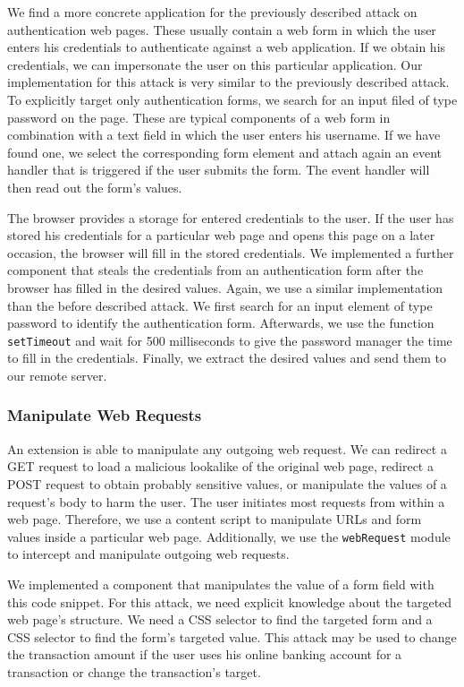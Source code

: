 	We find a more concrete application for the previously described attack on authentication web pages. These usually contain a web form in which the user enters his credentials to authenticate against a web application. If we obtain his credentials, we can impersonate the user on this particular application. Our implementation for this attack is very similar to the previously described attack. To explicitly target only authentication forms, we search for an input filed of type password on the page. These are typical components of a web form in combination with a text field in which the user enters his username. If we have found one, we select the corresponding form element and attach again an event handler that is triggered if the user submits the form. The event handler will then read out the form's values.

	The browser provides a storage for entered credentials to the user. If the user has stored his credentials for a particular web page and opens this page on a later occasion, the browser will fill in the stored credentials. We implemented a further component that steals the credentials from an authentication form after the browser has filled in the desired values. Again, we use a similar implementation than the before described attack. We first search for an input element of type password to identify the authentication form. Afterwards, we use the function \texttt{setTimeout} and wait for 500 milliseconds to give the password manager the time to fill in the credentials. Finally, we extract the desired values and send them to our remote server.
		
\subsubsection{Manipulate Web Requests}
\label{sec:manipulateWebRequests}

	An extension is able to manipulate any outgoing web request. We can redirect a GET request to load a malicious lookalike of the original web page, redirect a POST request to obtain probably sensitive values, or manipulate the values of a request's body to harm the user. The user initiates most requests from within a web page. Therefore, we use a content script to manipulate URLs and form values inside a particular web page. Additionally, we use the \texttt{webRequest} module to intercept and manipulate outgoing web requests.
	
	We implemented a component that manipulates the value of a form field with this code snippet. For this attack, we need explicit knowledge about the targeted web page's structure. We need a CSS selector to find the targeted form and a CSS selector to find the form's targeted value. This attack may be used to change the transaction amount if the user uses his online banking account for a transaction or change the transaction's target. 

